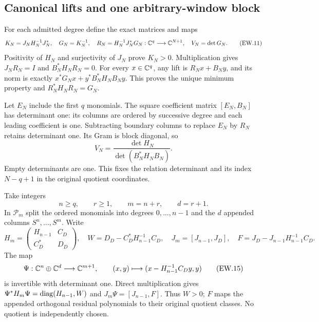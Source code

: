 \subsection{Canonical lifts and one arbitrary-window block}

For each admitted degree define the exact matrices and maps
\[
 K_N=J_NH_N^{-1}J_N^*,\quad G_N=K_N^{-1},\quad
 R_N=H_N^{-1}J_N^*G_N:\mathbb C^q\longrightarrow\mathbb C^{N+1},\quad
 V_N=\det G_N.                                               \tag{EW.11}
\]
Positivity of $H_N$ and surjectivity of $J_N$ prove $K_N>0$.
Multiplication gives $J_NR_N=I$ and $B_N^*H_NR_N=0$.
For every $x\in\mathbb C^q$, any lift is $R_Nx+B_Ny$, and its norm
is exactly $x^*G_Nx+y^*B_N^*H_NB_Ny$. This proves the unique
minimum property and $R_N^*H_NR_N=G_N$.

Let $E_N$ include the first $q$ monomials. The square coefficient
matrix $[E_N,B_N]$ has determinant one: its columns are ordered by
successive degree and each leading coefficient is one. Subtracting
boundary columns to replace $E_N$ by $R_N$ retains determinant
one. Its Gram is block diagonal, so
\[
 V_N=\frac{\det H_N}{\det(B_N^*H_NB_N)}.                    \tag{EW.12}
\]
Empty determinants are one. This fixes the relation determinant and
its index $N-q+1$ in the original quotient coordinates.

Take integers
\[
 n\ge q,\qquad r\ge1,\qquad m=n+r,\qquad d=r+1.
                                                               \tag{EW.13}
\]
In $\mathcal P_m$ split the ordered monomials into degrees
$0,\ldots,n-1$ and the $d$ appended columns $S^n,\ldots,S^m$.
Write
\[
 H_m=\begin{pmatrix}H_{n-1}&C_D\\C_D^*&D_D\end{pmatrix},\quad
 W=D_D-C_D^*H_{n-1}^{-1}C_D,\quad
 J_m=[J_{n-1},J_D],\quad F=J_D-J_{n-1}H_{n-1}^{-1}C_D.
                                                               \tag{EW.14}
\]
The map
\[
 \Psi:\mathbb C^n\oplus\mathbb C^d\longrightarrow\mathbb C^{m+1},\qquad
 (x,y)\longmapsto(x-H_{n-1}^{-1}C_Dy,y)                     \tag{EW.15}
\]
is invertible with determinant one. Direct multiplication gives
$\Psi^*H_m\Psi=\operatorname{diag}(H_{n-1},W)$ and
$J_m\Psi=[J_{n-1},F]$. Thus $W>0$; $F$ maps the appended
orthogonal residual polynomials to their original quotient classes.
No quotient is independently chosen.

